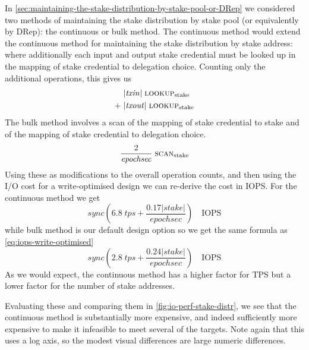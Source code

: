 \documentclass[11pt,a4paper]{article}
\begin{document}
In \cref{sec:maintaining-the-stake-distribution-by-stake-pool-or-DRep} we
considered two methods of maintaining the stake distribution by stake pool (or
equivalently by DRep): the continuous or bulk method. The continuous method
would extend the continuous method for maintaining the stake distribution by
stake address: where additionally each input and output stake credential must
be looked up in the mapping of stake credential to delegation choice. Counting
only the additional operations, this gives us
\begin{equation}
\begin{aligned}
      & |\mathit{txin}| \; \text{{\sc lookup}}_\text{stake} \\
 + \; & |\mathit{txout}| \; \text{{\sc lookup}}_\text{stake} \\
\end{aligned}
\end{equation}
The bulk method involves a scan of the mapping of stake credential to stake and
of the mapping of stake credential to delegation choice.
\begin{equation}
      \frac{2}{\mathit{epochsec}} \; \text{{\sc scan}}_\text{stake} \\
\end{equation}
Using these as modifications to the overall operation counts, and then using
the I/O cost for a write-optimised design we can re-derive the cost in IOPS.
For the continuous method we get
\begin{equation*}
\mathit{sync} \left(
    6.8 \; \mathit{tps} + \frac{0.17 |stake|}{\mathit{epochsec}}
  \right)\quad\text{IOPS}
\end{equation*}
while bulk method is our default design option so we get the same formula
as \cref{eq:iops-write-optimised}
\begin{equation*}
\mathit{sync} \left(
    2.8 \; \mathit{tps} + \frac{0.24 |stake|}{\mathit{epochsec}}
  \right)\quad\text{IOPS}
\end{equation*}
As we would expect, the continuous method has a higher factor for TPS but a
lower factor for the number of stake addresses.

Evaluating these and comparing them in \cref{fig:io-perf-stake-distr}, we see
that the continuous method is substantially more expensive, and indeed
sufficiently more expensive to make it infeasible to meet several of the
targets. Note again that this uses a log axis, so the modest visual differences
are large numeric differences.
\end{document}
